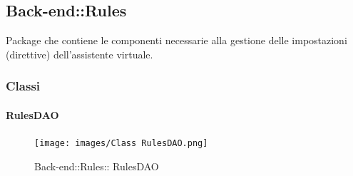 \subsection{Back-end::Rules}
Package che contiene le componenti necessarie alla gestione delle impostazioni (direttive) dell'assistente virtuale.
\subsubsection{Classi}
\hypertarget{ RulesDAO_label}{\paragraph{ RulesDAO}}
\begin{figure}[h]
	\centering
	\texttt{[image: images/Class RulesDAO.png]}
	\caption{Back-end::Rules:: RulesDAO}
\end{figure}
